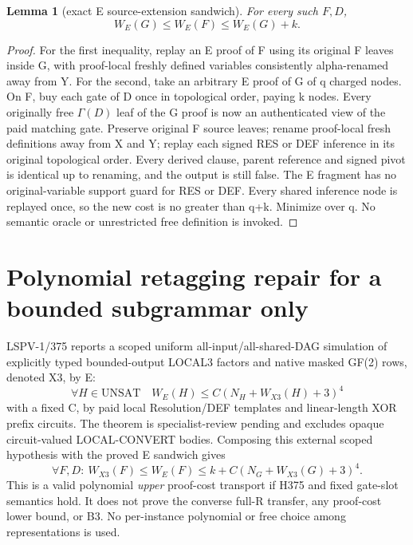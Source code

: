 \documentclass[11pt]{article}
\newtheorem{lemma}{Lemma}
\begin{document}
\begin{lemma}[exact E source-extension sandwich]
For every such $F,D$,
\[
\boxed{W_E(G)\le W_E(F)\le W_E(G)+k.}
\]
\end{lemma}
\begin{proof}
For the first inequality, replay an E proof of F using its original F leaves inside G, with proof-local freshly defined variables consistently alpha-renamed away from Y. For the second, take an arbitrary E proof of G of q charged nodes. On F, buy each gate of D once in topological order, paying k nodes. Every originally free $\Gamma(D)$ leaf of the G proof is now an authenticated view of the paid matching gate. Preserve original F source leaves; rename proof-local fresh definitions away from X and Y; replay each signed RES or DEF inference in its original topological order. Every derived clause, parent reference and signed pivot is identical up to renaming, and the output is still false. The E fragment has no original-variable support guard for RES or DEF. Every shared inference node is replayed once, so the new cost is no greater than q+k. Minimize over q. No semantic oracle or unrestricted free definition is invoked.
\end{proof}

\section*{Polynomial retagging repair for a bounded subgrammar only}
LSPV-1/375 reports a scoped uniform all-input/all-shared-DAG simulation of explicitly typed bounded-output LOCAL3 factors and native masked GF(2) rows, denoted X3, by E:
\[
\tag{H375} \forall H\in\mathrm{UNSAT}\quad W_E(H)\le C(N_H+W_{X3}(H)+3)^4
\]
with a fixed C, by paid local Resolution/DEF templates and linear-length XOR prefix circuits. The theorem is specialist-review pending and excludes opaque circuit-valued LOCAL-CONVERT bodies. Composing this external scoped hypothesis with the proved E sandwich gives
\[
\boxed{\forall F,D:\ W_{X3}(F)\le W_E(F)
\le k+C(N_G+W_{X3}(G)+3)^4.}
\]
This is a valid polynomial \emph{upper} proof-cost transport if H375 and fixed gate-slot semantics hold. It does not prove the converse full-R transfer, any proof-cost lower bound, or B3. No per-instance polynomial or free choice among representations is used.
\end{document}
